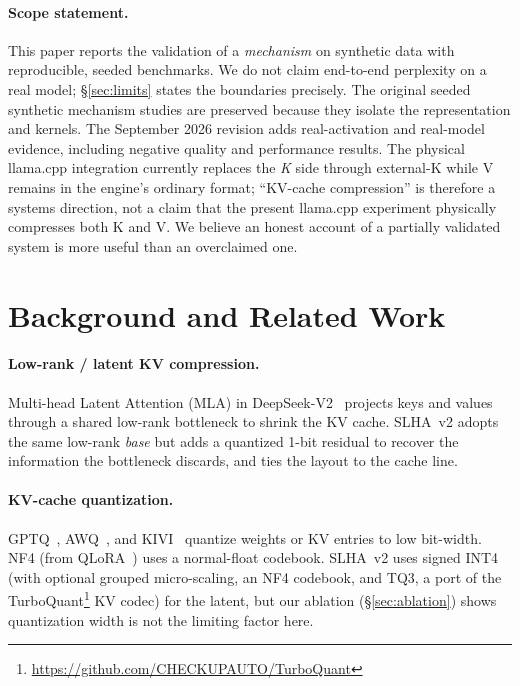 \documentclass[11pt]{article}
\newcommand{\added}[1]{\textcolor{revisionblue}{#1}}
\newcommand{\deleted}[1]{\textcolor{revisionred}{#1}}
\theoremstyle{plain}
\theoremstyle{definition}
\begin{document}
\paragraph{Scope statement.}
\deleted{This paper reports the validation of a \emph{mechanism} on synthetic
data with reproducible, seeded benchmarks. We do not claim end-to-end
perplexity on a real model; \S\ref{sec:limits} states the boundaries
precisely.}
\added{The original seeded synthetic mechanism studies are preserved because
they isolate the representation and kernels. The September 2026 revision adds
real-activation and real-model evidence, including negative quality and
performance results. The physical llama.cpp integration currently replaces the
\emph{K} side through external-K while V remains in the engine's ordinary
format; ``KV-cache compression'' is therefore a systems direction, not a claim
that the present llama.cpp experiment physically compresses both K and V.}
We believe an honest account of a partially validated system is more useful
than an overclaimed one.

\section{Background and Related Work}
\label{sec:related}

\paragraph{Low-rank / latent KV compression.}
Multi-head Latent Attention (MLA) in DeepSeek-V2~\cite{deepseekv2}
projects keys and values through a shared low-rank bottleneck to shrink
the KV cache. SLHA~v2 adopts the same low-rank \emph{base} but adds a
quantized 1-bit residual to recover the information the bottleneck
discards, and ties the layout to the cache line.

\paragraph{KV-cache quantization.}
GPTQ~\cite{gptq}, AWQ~\cite{awq}, and KIVI~\cite{kivi} quantize weights
or KV entries to low bit-width. NF4 (from QLoRA~\cite{qlora}) uses a
normal-float codebook. SLHA~v2 uses signed INT4 (with optional grouped
micro-scaling, an NF4 codebook, and TQ3, a port of the
TurboQuant\footnote{\url{https://github.com/CHECKUPAUTO/TurboQuant}} KV
codec) for the latent, but our ablation
(\S\ref{sec:ablation}) shows quantization width is not the limiting
factor here.
\end{document}
